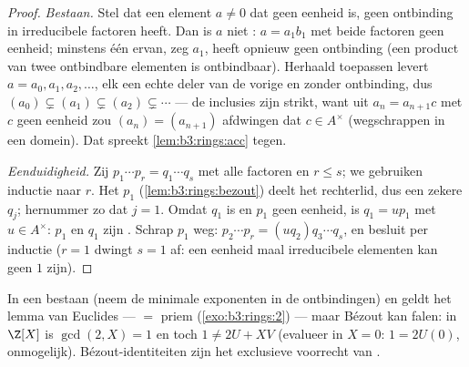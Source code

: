 \begin{proof}
\emph{Bestaan.} Stel dat een element $a \neq 0$ dat geen eenheid
is, geen ontbinding in irreducibele factoren heeft. Dan is $a$ niet
: $a = a_1b_1$ met beide factoren geen eenheid; minstens
één ervan, zeg $a_1$, heeft opnieuw geen ontbinding (een product
van twee ontbindbare elementen is ontbindbaar). Herhaald toepassen
levert $a = a_0, a_1, a_2, \dots$, elk een echte deler van de
vorige en zonder ontbinding, dus $(a_0) \subsetneq (a_1) \subsetneq
(a_2) \subsetneq \cdots$ --- de inclusies zijn strikt, want uit
$a_n = a_{n+1}c$ met $c$ geen eenheid zou $(a_n) = (a_{n+1})$
afdwingen dat $c \in A^\times$ (wegschrappen in een domein). Dat
spreekt \cref{lem:b3:rings:acc} tegen.

\emph{Eenduidigheid.} Zij $p_1 \cdots p_r = q_1 \cdots q_s$ met
alle factoren  en $r \leq s$; we gebruiken inductie naar
$r$. Het  $p_1$ (\cref{lem:b3:rings:bezout}) deelt het
rechterlid, dus een zekere $q_j$; hernummer zo dat $j = 1$. Omdat
$q_1$  is en $p_1$ geen eenheid, is $q_1 = u p_1$ met $u
\in A^\times$: $p_1$ en $q_1$ zijn . Schrap $p_1$ weg:
$p_2 \cdots p_r = (u q_2) q_3\cdots q_s$, en besluit per inductie
($r = 1$ dwingt $s = 1$ af: een eenheid maal irreducibele elementen
kan geen $1$ zijn).
\end{proof}

\begin{remark}\label{rem:b3:rings:ufdgcd}
In een  bestaan  (neem de minimale
exponenten in de ontbindingen) en geldt het lemma van Euclides ---
 $=$ priem (\cref{exo:b3:rings:2}) --- maar Bézout kan
falen: in $\Z[X]$ is $\gcd(2, X) = 1$ en toch $1 \neq 2U + XV$
(evalueer in $X = 0$: $1 = 2U(0)$, onmogelijk). Bézout-identiteiten
zijn het exclusieve voorrecht van .
\end{remark}

